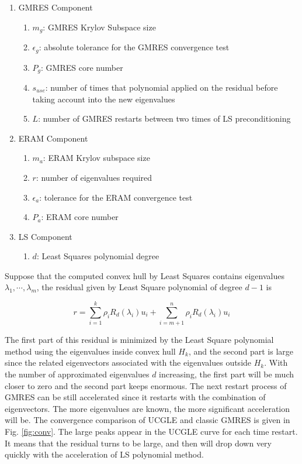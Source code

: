 \begin{enumerate}[]
	\item GMRES Component
	\begin{enumerate}[]
		\item $m_g$: GMRES Krylov Subspace size 
		\item $\epsilon_g$: absolute tolerance for  the GMRES convergence test
		\item $P_g$: GMRES core number
		\item $s_{use}$: number of times that polynomial applied on the residual before taking account into the new eigenvalues
		\item $L$: number of GMRES restarts between two times of LS preconditioning
	\end{enumerate}
	\item ERAM Component
	\begin{enumerate}[]
		\item $m_a$: ERAM Krylov subspace size
		\item $r$: number of eigenvalues required
		\item $\epsilon_a$: tolerance for the ERAM convergence test
		\item $P_a$: ERAM core number
	\end{enumerate}
	\item LS Component
	\begin{enumerate}[]
		\item $d$: Least Squares polynomial degree
	\end{enumerate}
\end{enumerate}

Suppose that the computed convex hull by Least Squares contains eigenvalues $\lambda_1,\cdots, \lambda_m$, the residual given by Least Square polynomial of degree $d-1$ is

\[
r = \sum_{i=1}^{k}\rho_i R_d(\lambda_i)u_i + \sum_{i=m+1}^{n}\rho_i R_d(\lambda_i)u_i
\]

The first part of this residual is minimized by the Least Square polynomial method using the eigenvalues inside convex hull $H_k$, and the second part is large since the related eigenvectors associated with the eigenvalues outside $H_k$. With the number of approximated eigenvalues $d$ increasing, the first part will be much closer to zero and the second part keeps enormous. The next restart process of GMRES can be still accelerated since it restarts with the combination of eigenvectors. The more eigenvalues are known, the more significant acceleration will be. The convergence comparison of UCGLE and classic GMRES is given in Fig. \ref{fig:conv}. The large peaks appear in the UCGLE curve for each time restart. It means that the residual turns to be large, and then will drop down very quickly with the acceleration of LS polynomial method.

